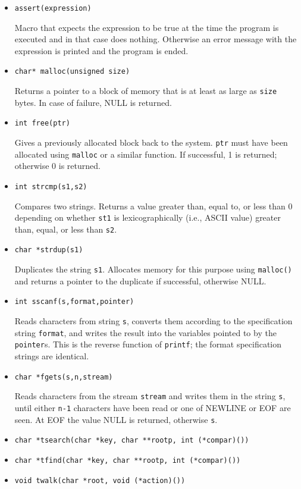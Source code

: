 \begin{itemize}

\item {\tt assert(expression)}

Macro that expects the expression to be true at the time the
program is executed and in that case does nothing.  Otherwise an error
message with the expression is printed and the program is ended.

\item {\tt char* malloc(unsigned size)}

Returns a pointer to a block of memory that is at least as large as
{\tt size} bytes.  In case of failure, NULL is returned.

\item {\tt int free(ptr)}

Gives a previously allocated block back to the system.  
{\tt ptr} must have been  allocated using {\tt malloc} or a similar
function.  If successful, 1 is returned; otherwise 0 is returned.

\item {\tt int strcmp(s1,s2)}

Compares two strings.  Returns a value greater than, equal to, or less
than 0 depending on whether {\tt st1} is lexicographically (i.e.,
ASCII value) greater than, equal, or less than {\tt s2}.

\item {\tt char *strdup(s1)}

Duplicates the string {\tt s1}.  Allocates memory for this purpose
using {\tt malloc()} and returns a pointer to the duplicate if
successful, otherwise NULL.

\item {\tt int sscanf(s,format,pointer)}

Reads characters from string {\tt s}, converts them according to
the specification string {\tt format}, and writes the result into
the variables pointed to by the {\tt pointer}s.
This is the reverse function of {\tt printf}; the format specification
strings are identical.

\item {\tt char *fgets(s,n,stream)}

Reads characters from the stream {\tt stream} and writes them in the
string {\tt s}, until either {\tt n-1} characters have been read or
one of NEWLINE or EOF are seen.
At EOF the value NULL is returned, otherwise {\tt s}.

\item {\tt char *tsearch(char *key, char **rootp, int (*compar)())}
\item {\tt char *tfind(char *key, char **rootp, int (*compar)())}
\item {\tt void twalk(char *root, void (*action)())}


\end{itemize}
